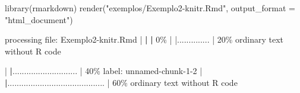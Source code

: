 \documentclass[
  10pt,
  a4paper]{book}
\newenvironment{Shaded}{\begin{snugshade}}{\end{snugshade}}
\newcommand{\AttributeTok}[1]{\textcolor[rgb]{0.77,0.63,0.00}{#1}}
\newcommand{\DecValTok}[1]{\textcolor[rgb]{0.00,0.00,0.81}{#1}}
\newcommand{\ErrorTok}[1]{\textcolor[rgb]{0.64,0.00,0.00}{\textbf{#1}}}
\newcommand{\FunctionTok}[1]{\textcolor[rgb]{0.00,0.00,0.00}{#1}}
\newcommand{\NormalTok}[1]{#1}
\newcommand{\SpecialCharTok}[1]{\textcolor[rgb]{0.00,0.00,0.00}{#1}}
\newcommand{\StringTok}[1]{\textcolor[rgb]{0.31,0.60,0.02}{#1}}
\begin{document}
\begin{Shaded}
\begin{Highlighting}[]
\FunctionTok{library}\NormalTok{(rmarkdown)}
\FunctionTok{render}\NormalTok{(}\StringTok{"exemplos/Exemplo2{-}knitr.Rmd"}\NormalTok{,  }\AttributeTok{output\_format =} \StringTok{"html\_document"}\NormalTok{)}


\NormalTok{processing file}\SpecialCharTok{:}\NormalTok{ Exemplo2}\SpecialCharTok{{-}}\NormalTok{knitr.Rmd}
  \SpecialCharTok{|}                                                                              \ErrorTok{|}                                                                      \ErrorTok{|}   \DecValTok{0}\SpecialCharTok{\%  |                                                                              |..............                                                        |  20\%}
\NormalTok{  ordinary text without R code}

  \SpecialCharTok{|}                                                                              \ErrorTok{|}\NormalTok{............................                                          }\SpecialCharTok{|}  \DecValTok{40}\NormalTok{\%}
\NormalTok{label}\SpecialCharTok{:}\NormalTok{ unnamed}\SpecialCharTok{{-}}\NormalTok{chunk}\DecValTok{{-}1{-}2}
  \SpecialCharTok{|}                                                                              \ErrorTok{|}\NormalTok{..........................................                            }\SpecialCharTok{|}  \DecValTok{60}\NormalTok{\%}
\NormalTok{  ordinary text without R code}


\end{Highlighting}
\end{Shaded}
\end{document}
